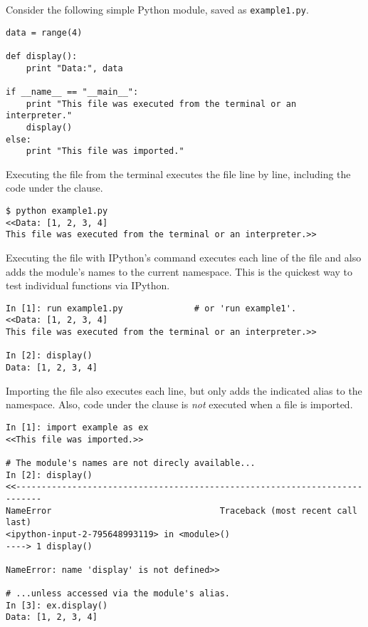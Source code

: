 Consider the following simple Python module, saved as \texttt{example1.py}.

\begin{lstlisting}
data = range(4)

def display():
    print "Data:", data

if __name__ == "__main__":
    print "This file was executed from the terminal or an interpreter."
    display()
else:
    print "This file was imported."
\end{lstlisting}

Executing the file from the terminal executes the file line by line, including the code under the  clause.

\begin{lstlisting}
$ python example1.py
<<Data: [1, 2, 3, 4]
This file was executed from the terminal or an interpreter.>>
\end{lstlisting}

Executing the file with IPython's  command executes each line of the file and also adds the module's names to the current namespace.
This is the quickest way to test individual functions via IPython.

\begin{lstlisting}
In [1]: run example1.py              # or 'run example1'.
<<Data: [1, 2, 3, 4]
This file was executed from the terminal or an interpreter.>>

In [2]: display()
Data: [1, 2, 3, 4]
\end{lstlisting}

Importing the file also executes each line, but only adds the indicated alias to the namespace.
Also, code under the  clause is \emph{not} executed when a file is imported.

\begin{lstlisting}
In [1]: import example as ex
<<This file was imported.>>

# The module's names are not direcly available...
In [2]: display()
<<---------------------------------------------------------------------------
NameError                                 Traceback (most recent call last)
<ipython-input-2-795648993119> in <module>()
----> 1 display()

NameError: name 'display' is not defined>>

# ...unless accessed via the module's alias.
In [3]: ex.display()
Data: [1, 2, 3, 4]
\end{lstlisting}

